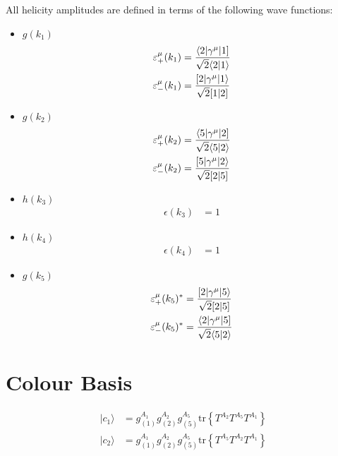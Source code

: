 \documentclass[a4paper]{article}
\newcommand{\Spaa}[1]{\langle #1 \rangle}
\newcommand{\Spab}[1]{\langle #1]}
\newcommand{\Spba}[1]{[ #1 \rangle}
\newcommand{\Spbb}[1]{[ #1 ]}
\begin{document}
All helicity amplitudes are defined in terms of the following wave functions:
\begin{itemize}
\item $g(k_{1})$ 
\begin{align}
\varepsilon^\mu_+(k_{1}) &=
   \frac{\Spab{2\vert\gamma^\mu\vert 1}}{%
   \sqrt{2}\Spaa{2\vert 1}}\\
\varepsilon^\mu_-(k_{1}) &=
   \frac{\Spba{2\vert\gamma^\mu\vert 1}}{%
   \sqrt{2}\Spbb{1\vert 2}}
\end{align}
\item $g(k_{2})$ 
\begin{align}
\varepsilon^\mu_+(k_{2}) &=
   \frac{\Spab{5\vert\gamma^\mu\vert 2}}{%
   \sqrt{2}\Spaa{5\vert 2}}\\
\varepsilon^\mu_-(k_{2}) &=
   \frac{\Spba{5\vert\gamma^\mu\vert 2}}{%
   \sqrt{2}\Spbb{2\vert 5}}
\end{align}
\item $h(k_3)$ 
\begin{align}
\epsilon(k_{3}) &= 1
\end{align}
\item $h(k_4)$ 
\begin{align}
\epsilon(k_{4}) &= 1
\end{align}
\item $g(k_5)$ 
\begin{align}
\varepsilon^\mu_+(k_{5})^\ast &=
   \frac{\Spba{2\vert\gamma^\mu\vert 5}}{%
   \sqrt{2}\Spbb{2\vert 5}}\\
\varepsilon^\mu_-(k_{5})^\ast &=
   \frac{\Spab{2\vert\gamma^\mu\vert 5}}{%
   \sqrt{2}\Spaa{5\vert 2}}
\end{align}
\end{itemize}

\section{Colour Basis}
\begin{align}
\vert c_{1}\rangle &=g^{A_{1}}_{(1)}g^{A_{2}}_{(2)}g^{A_{5}}_{(5)}\textrm{tr}\left\{T^{A_{2}}T^{A_{5}}T^{A_{1}}\right\}\\
\vert c_{2}\rangle &=g^{A_{1}}_{(1)}g^{A_{2}}_{(2)}g^{A_{5}}_{(5)}\textrm{tr}\left\{T^{A_{5}}T^{A_{2}}T^{A_{1}}\right\}
\end{align}
\end{document}
